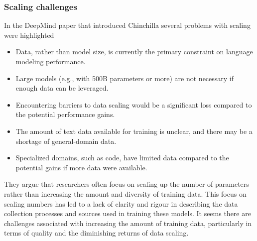 \subsubsection{Scaling challenges}
In the DeepMind paper that introduced Chinchilla \cite{hoffmann2022empirical} several problems with scaling were highlighted
\begin{itemize}
\item Data, rather than model size, is currently the primary constraint on language modeling performance.
\item Large models (e.g., with 500B parameters or more) are not necessary if enough data can be leveraged.
\item Encountering barriers to data scaling would be a significant loss compared to the potential performance gains.
\item The amount of text data available for training is unclear, and there may be a shortage of general-domain data.
\item Specialized domains, such as code, have limited data compared to the potential gains if more data were available.
\end{itemize}
They argue that researchers often focus on scaling up the number of parameters rather than increasing the amount and diversity of training data. This focus on scaling numbers has led to a lack of clarity and rigour in describing the data collection processes and sources used in training these models. It seems  there are challenges associated with increasing the amount of training data, particularly in terms of quality and the diminishing returns of data scaling. 

